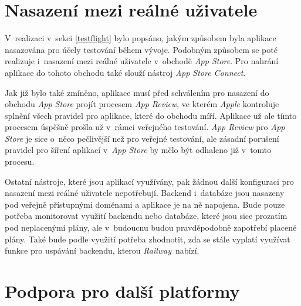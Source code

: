 \section{Nasazení mezi reálné uživatele}

V~realizaci v~sekci \ref{testflight} bylo popsáno, jakým způsobem byla aplikace nasazována pro účely testování během vývoje. Podobným způsobem se poté realizuje i~nasazení mezi reálné uživatele v~obchodě \emph{App Store}. Pro nahrání aplikace do tohoto obchodu také slouží nástroj \emph{App Store Connect}.

Jak již bylo také zmíněno, aplikace musí před schválením pro nasazení do obchodu \emph{App Store} projít procesem \emph{App Review}, ve kterém \emph{Apple} kontroluje splnění všech pravidel pro aplikace, které do obchodu míří. Aplikace už ale tímto procesem úspěšně prošla už v~rámci veřejného testování. \emph{App Review} pro \emph{App Store} je sice o~něco pečlivější než pro veřejné testování, ale zásadní porušení pravidel pro šíření aplikací v~\emph{App Store} by mělo být odhaleno již v~tomto procesu.

Ostatní nástroje, které jsou aplikací využívány, pak žádnou další konfiguraci pro nasazení mezi reálné uživatele nepotřebují. Backend i~databáze jsou nasazeny pod veřejně přístupnými doménami a aplikace je na ně napojena. Bude pouze potřeba monitorovat využití backendu nebo databáze, které jsou sice prozatím pod neplacenými plány, ale v~budoucnu budou pravděpodobně zapotřebí placené plány. Také bude podle využití potřeba zhodnotit, zda se stále vyplatí využívat funkce pro uspávání backendu, kterou \emph{Railway} nabízí.

\section{Podpora pro další platformy}

